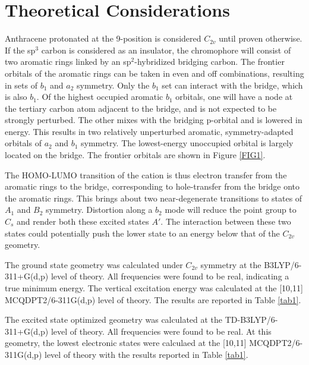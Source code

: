 \documentclass[12pt]{article}
\begin{document}
\section*{Theoretical Considerations}
Anthracene protonated at the 9-position is considered $C_{2v}$ until proven otherwise. If the sp$^3$ carbon is considered as an insulator, the chromophore will consist of two aromatic rings linked by an sp$^2$-hybridized bridging carbon. The frontier orbitals of the aromatic rings can be taken in even and off combinations, resulting in sets of $b_1$ and $a_2$ symmetry. Only the $b_1$ set can interact with the bridge, which is also $b_1$. Of the highest occupied aromatic $b_1$ orbitals, one will have a node at the tertiary carbon atom adjacent to the bridge, and is not expected to be strongly perturbed. The other mixes with the bridging p-orbital and is lowered in energy. This results in two relatively unperturbed aromatic, symmetry-adapted orbitals of $a_2$ and $b_1$ symmetry. The lowest-energy unoccupied orbital is largely located on the bridge. The frontier orbitals are shown in Figure \ref{FIG1}.

The HOMO-LUMO transition of the cation is thus electron transfer from the aromatic rings to the bridge, corresponding to hole-transfer from the bridge onto the aromatic rings. This brings about two near-degenerate transitions to states of $A_1$ and $B_2$ symmetry. Distortion along a $b_2$ mode will reduce the point group to $C_s$ and render both these excited states $A'$. The interaction between these two states could potentially push the lower state to an energy below that of the $C_{2v}$ geometry.

The ground state geometry was calculated under $C_{2v}$ symmetry at the B3LYP/6-311+G(d,p) level of theory. All frequencies were found to be real, indicating a true minimum energy. The vertical excitation energy was calculated at the [10,11] MCQDPT2/6-311G(d,p) level of theory. The results are reported in Table \ref{tab1}.

The excited state optimized geometry was calculated at the TD-B3LYP/6-311+G(d,p) level of theory. All frequencies were found to be real. At this geometry, the lowest electronic states were calculaed at the [10,11] MCQDPT2/6-311G(d,p) level of theory with the results reported in Table \ref{tab1}.
\end{document}
